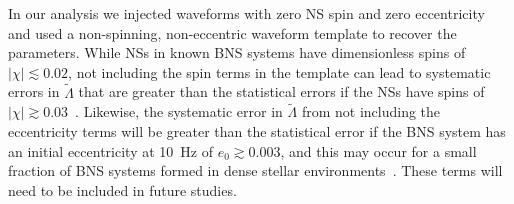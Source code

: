 \documentclass[twocolumn,prd,amssymb,aps,nofootinbib,showpacs,epsf]{revtex4}
\newcommand\les[2]{\textcolor{blue}{{#1}\sout{#2}}}
\begin{document}


In our analysis we injected waveforms with zero NS spin and zero eccentricity and used a non-spinning, non-eccentric waveform template to recover the parameters. While NSs in known BNS systems have dimensionless spins of $|\chi| \lesssim 0.02$, not including the spin terms in the template can lead to systematic errors in $\tilde\Lambda$ that are greater than the statistical errors if the NSs have spins of $|\chi| \gtrsim 0.03$~\cite{Favata2014}. Likewise, the systematic error in $\tilde\Lambda$ from not including the eccentricity terms will be greater than the statistical error if the BNS system has an initial eccentricity at 10~Hz of $e_0 \gtrsim 0.003$, and this may occur for a small fraction of BNS systems formed in dense stellar environments~\cite{Favata2014}. These terms will need to be included in future studies.
\end{document}
